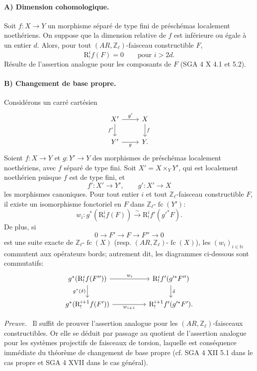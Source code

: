 \documentclass[11pt]{article}
\newenvironment{prooftext}[1][Proof]{\par\noindent\emph{#1.}\ }{\par\medskip}
\newcommand{\R}{\mathrm{R}}\newcommand{\RHomCore}{\mathrm{RHom}}
\providecommand{\fc}{\operatorname{fc}}
\providecommand{\R}{\mathrm R}
\begin{document}
\paragraph{A) Dimension cohomologique.}
Soit \(f:X\to Y\) un morphisme séparé de type fini de préschémas localement noethériens. On suppose que la dimension relative de \(f\) est inférieure ou égale à un entier \(d\). Alors, pour tout \((AR,\mathbb Z_\ell)\)-faisceau constructible \(F\),
\[
\R^i_!f(F)=0\qquad\text{pour }i>2d.
\]
Résulte de l'assertion analogue pour les composants de \(F\) (SGA 4 X 4.1 et 5.2).

\paragraph{B) Changement de base propre.}
Considérons un carré cartésien
\[
\begin{tikzcd}
X' \arrow[r,"g'"] \arrow[d,"f'"'] & X \arrow[d,"f"]\\
Y' \arrow[r,"g"'] & Y .
\end{tikzcd}
\]
Soient \(f:X\to Y\) et \(g:Y'\to Y\) des morphismes de préschémas localement noethériens, avec \(f\) séparé de type fini. Soit \(X'=X\times_Y Y'\), qui est localement noethérien puisque \(f\) est de type fini, et
\[
f':X'\to Y',\qquad g':X'\to X
\]
les morphismes canoniques. Pour tout entier \(i\) et tout \(\mathbb Z_\ell\)-faisceau constructible \(F\), il existe un isomorphisme fonctoriel en \(F\) dans \(\mathbb Z_\ell\text{-}\fc(Y')\):
\[
w_i:g^*(\R^i_!f(F))\xrightarrow{\sim} \R^i_!f'(g'^*F).
\]
De plus, si
\[
0\longrightarrow F'\longrightarrow F\longrightarrow F''\longrightarrow 0
\]
est une suite exacte de \(\mathbb Z_\ell\text{-}\fc(X)\) (resp. \((AR,\mathbb Z_\ell)\text{-}\fc(X)\)), les \((w_i)_{i\in\mathbb N}\) commutent aux opérateurs bords; autrement dit, les diagrammes ci-dessous sont commutatifs:
\[
\begin{tikzcd}[column sep=huge]
g^*(\R^i_!f(F'')) \arrow[r,"w_i"] \arrow[d,"g^*(\delta)"']
&
\R^i_!f'(g'^*F'') \arrow[d,"\delta"]\\
g^*(\R^{i+1}_!f(F')) \arrow[r,"w_{i+1}"']
&
\R^{i+1}_!f'(g'^*F').
\end{tikzcd}
\]

\begin{prooftext}[Preuve]
Il suffit de prouver l'assertion analogue pour les \((AR,\mathbb Z_\ell)\)-faisceaux constructibles. Or elle se déduit par passage au quotient de l'assertion analogue pour les systèmes projectifs de faisceaux de torsion, laquelle est conséquence immédiate du théorème de changement de base propre (cf. SGA 4 XII 5.1 dans le cas propre et SGA 4 XVII dans le cas général).
\end{prooftext}
\end{document}
